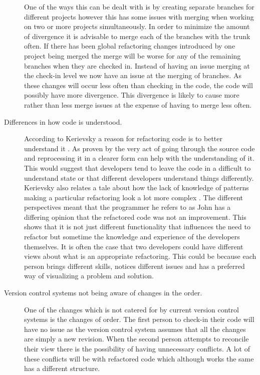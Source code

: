 \begin{description}
One of the ways this can be dealt with is by creating separate branches for different projects however this has some issues with merging when working on two or more projects simultaneously.  In order to minimize the amount of divergence it is advisable to merge each of the branches with the trunk often.  If there has been global refactoring changes introduced by one project being merged the merge will be worse for any of the remaining branches when they are checked in.  Instead of having an issue merging at the check-in level we now have an issue at the merging of branches.  As these changes will occur less often than checking in the code, the code will possibly have more divergence.  This divergence is likely to cause more rather than less merge issues at the expense of having to merge less often.
\item [Differences in how code is understood.]    
According to  Kerievsky a reason for refactoring code is to better understand it \cite{Kerievsky2004}. As proven by \cite{Bois2005} the very act of going through the source code and reprocessing it in a clearer form can help with the understanding of it. This would suggest that developers tend to leave the code in a difficult to understand state or that different developers understand things differently.
Kerievsky also relates a tale about how the lack of knowledge of patterns making a particular refactoring look a lot more complex \cite{Kerievsky2004}. The different perspectives meant that the programmer he refers to as John has a differing opinion that the refactored code was not an improvement. This shows that it is not just different functionality that influences the need to refactor but sometime the knowledge and experience of the developers themselves. It is often the case that two developers could have different views about what is an appropriate refactoring. This could be because each person brings different skills, notices different issues and has a preferred way of visualizing a problem and solution.
\item [Version control systems not being aware of changes in the order.]
One of the changes which is not catered for by current version control systems is the changes of order.  The first person to check-in their code will have no issue as the version control system assumes that all the changes are simply a new revision.  When the second person attempts to reconcile their view there is the possibility of having unnecessary conflicts.  A lot of these conflicts will be with refactored code which although works the same has a different structure.
\end{description}







